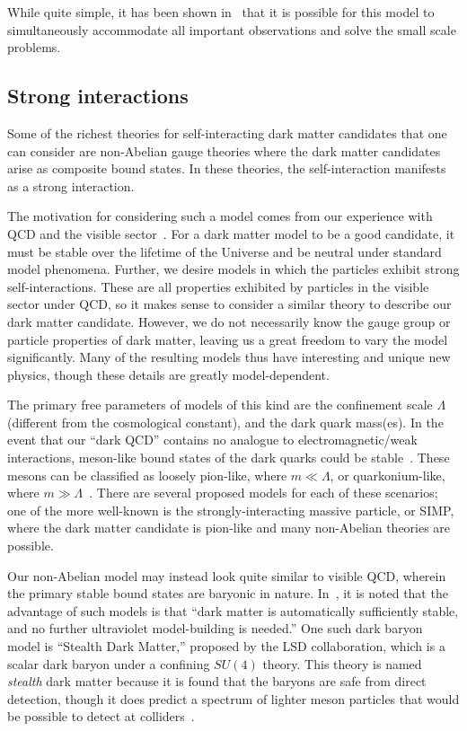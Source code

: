 While quite simple, it has been shown in~\cite{tulin_resonant_2013} that it is
possible for this model to simultaneously accommodate all important
observations and solve the small scale problems.

\hypertarget{strong-interactions}{%
\subsection{Strong interactions}\label{strong-interactions}}

Some of the richest theories for self-interacting dark matter candidates that
one can consider are non-Abelian gauge theories where the dark matter
candidates arise as composite bound states. In these theories, the
self-interaction manifests as a strong interaction.

The motivation for considering such a model comes from our experience with QCD
and the visible sector~\cite{kribs_review_2016}. For a dark matter model to be
a good candidate, it must be stable over the lifetime of the Universe and be
neutral under standard model phenomena. Further, we desire models in which the
particles exhibit strong self-interactions. These are all properties exhibited
by particles in the visible sector under QCD, so it makes sense to consider a
similar theory to describe our dark matter candidate. However, we do not
necessarily know the gauge group or particle properties of dark matter,
leaving us a great freedom to vary the model significantly. Many of the
resulting models thus have interesting and unique new physics, though these
details are greatly model-dependent.

The primary free parameters of models of this kind are the confinement scale
\(\Lambda\) (different from the cosmological constant), and the dark quark
mass(es). In the event that our ``dark QCD'' contains no analogue to
electromagnetic/weak interactions, meson-like bound states of the dark quarks
could be stable~\cite{cline_composite_2014}. These mesons can be classified as
loosely pion-like, where \(m \ll \Lambda\), or quarkonium-like, where \(m \gg
\Lambda\)~\cite{kribs_review_2016}. There are several proposed models for each
of these scenarios; one of the more well-known is the strongly-interacting
massive particle, or SIMP, where the dark matter candidate is pion-like and
many non-Abelian theories are possible.

Our non-Abelian model may instead look quite similar to visible QCD, wherein
the primary stable bound states are baryonic in nature.
In~\cite{kribs_review_2016}, it is noted that the advantage of such models is
that ``dark matter is automatically sufficiently stable, and no further
ultraviolet model-building is needed.'' One such dark baryon model is
``Stealth Dark Matter,'' proposed by the LSD collaboration, which is a scalar
dark baryon under a confining \(SU(4)\) theory. This theory is named
\emph{stealth} dark matter because it is found that the baryons are safe from
direct detection, though it does predict a spectrum of lighter meson particles
that would be possible to detect at colliders~\cite{kribs_review_2016}.

